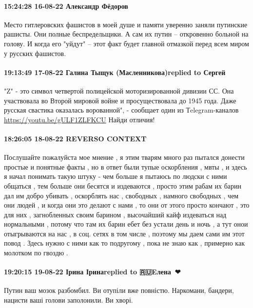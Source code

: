  
 
 
 
 

\paragraph{15:24:28 16-08-22 Александр Фёдоров}

\obeycr
Место гитлеровских фашистов в моей душе и памяти уверенно заняли путинские рашисты. 
Они полные беспредельщики. А сам их путин -- откровенно больной на голову. 
И когда его "уйдут" -- этот факт будет главной отмазкой перед всем миром у русских фашистов.
\restorecr

\paragraph{19:13:49 17-08-22 Галина Тыщук (Масленникова)replied to Сергей}

"Z" - это символ четвертой полицейской моторизированной дивизии СС. Она
участвовала во Второй мировой войне и просуществовала до 1945 года. Даже
русская свастика оказалась ворованной", - сообщает один из Тelegram-каналов
\url{https://youtu.be/gULF1ZLFKCU} Найди отличия!

\paragraph{18:26:05 18-08-22 REVERSO CONTEXT}

Послушайте пожалуйста мое мнение , я этим тварям много раз пытался донести
простые и понятные факты , но в ответ были тупые оскорбления , мвты , и здесь я
начал понимать такую штуку - чем больше я пытаюсь по людски с ними общаться ,
тем больше они бесятся и издеваются , просто этим рабам их барин дал им добро
убивать , оскорблять нас , свободных , намного свободных , чем они людей , и
когда они это делают с нами , то они от этого просто кончают , это для них ,
загнобленных своим барином , высочайший кайф издеваться над нормальными ,
потому что там их барин ебет без устали день и ночь , а тут онои отыгрываются
на нас , в соц. сетях в том числе , поэтому мы даем сами им этот повод . Здесь
нужно с ними как то подругому , пока не знаю как , примерно как молотком по
гвоздю .

\paragraph{19:20:15 19-08-22 Ірина Іринаreplied to 🇷🇺Eлена🤍💙❤}

Путин ваш мозок разбомбил. Ви отупіли вже повністю. Наркомани, бандери, нацисти
ваші голови заполонили. Ви хворі.
